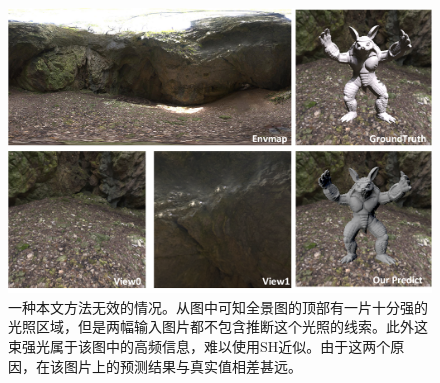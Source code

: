 \begin{figure}
  \includegraphics[width=\columnwidth]{Img/fig-failure.png}
  \caption[光照预测失败的例子]{
    \label{fig:failure-case}
    一种本文方法无效的情况。从图中可知全景图的顶部有一片十分强的光照区域，但是两幅输入图片都不包含推断这个光照的线索。此外这束强光属于该图中的高频信息，难以使用SH近似。由于这两个原因，在该图片上的预测结果与真实值相差甚远。}
\end{figure}